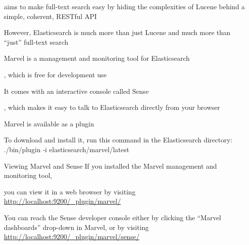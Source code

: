 
aims to make full-text search easy by hiding the complexities of Lucene behind a simple, coherent, RESTful API

However, Elasticsearch is much more than just Lucene and much more than “just” full-text search

Marvel is a management and monitoring tool for Elasticsearch

, which is free for development use

It comes with an interactive console called Sense

, which makes it easy to talk to Elasticsearch directly from your browser

Marvel is available as a plugin

To download and install it, run this command in the Elasticsearch directory: ./bin/plugin -i elasticsearch/marvel/latest 

Viewing Marvel and Sense If you installed the Marvel management and monitoring tool, 

you can view it in a web browser by visiting \url{http://localhost:9200/_plugin/marvel/}

You can reach the Sense developer console either by clicking the “Marvel dashboards” drop-down in Marvel, or by visiting \url{http://localhost:9200/_plugin/marvel/sense/}
